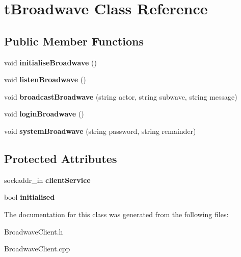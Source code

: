 \hypertarget{classtBroadwave}{\section{t\-Broadwave Class Reference}
\label{classtBroadwave}
}
\subsection*{Public Member Functions}
\begin{DoxyCompactItemize}
\item 
\hypertarget{classtBroadwave_a66ca08d576ca703db094ccd501ba1ef1}{void {\bfseries initialise\-Broadwave} ()}\label{classtBroadwave_a66ca08d576ca703db094ccd501ba1ef1}

\item 
\hypertarget{classtBroadwave_a74ec4ce019b8c3a76b38322628944425}{void {\bfseries listen\-Broadwave} ()}\label{classtBroadwave_a74ec4ce019b8c3a76b38322628944425}

\item 
\hypertarget{classtBroadwave_a0c5a7502622dbc6e5250787c60994be6}{void {\bfseries broadcast\-Broadwave} (string actor, string subwave, string message)}\label{classtBroadwave_a0c5a7502622dbc6e5250787c60994be6}

\item 
\hypertarget{classtBroadwave_ab8683c7cb9d5f0dbc2c26e3f4280a410}{void {\bfseries login\-Broadwave} ()}\label{classtBroadwave_ab8683c7cb9d5f0dbc2c26e3f4280a410}

\item 
\hypertarget{classtBroadwave_a9440718c9bc24ec9ca48c4cec153ee79}{void {\bfseries system\-Broadwave} (string password, string remainder)}\label{classtBroadwave_a9440718c9bc24ec9ca48c4cec153ee79}

\end{DoxyCompactItemize}
\subsection*{Protected Attributes}
\begin{DoxyCompactItemize}
\item 
\hypertarget{classtBroadwave_adff4bca86536a98a70666d4a6151f0c0}{sockaddr\-\_\-in {\bfseries client\-Service}}\label{classtBroadwave_adff4bca86536a98a70666d4a6151f0c0}

\item 
\hypertarget{classtBroadwave_a870c289fd02820e7398ee604675c9783}{bool {\bfseries initialised}}\label{classtBroadwave_a870c289fd02820e7398ee604675c9783}

\end{DoxyCompactItemize}


The documentation for this class was generated from the following files\-:\begin{DoxyCompactItemize}
\item 
Broadwave\-Client.\-h\item 
Broadwave\-Client.\-cpp\end{DoxyCompactItemize}
